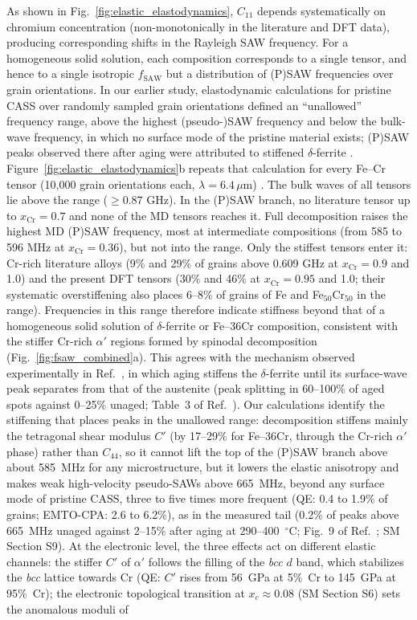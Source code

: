 \documentclass[final,3p,times]{elsarticle}
\begin{document}
As shown in Fig.~\ref{fig:elastic_elastodynamics}, $C_{11}$ depends systematically on chromium concentration (non-monotonically in the literature and DFT data), producing corresponding shifts in the Rayleigh SAW frequency. For a homogeneous solid solution, each composition corresponds to a single tensor, and hence to a single isotropic $f_{\mathrm{SAW}}$ but a distribution of (P)SAW frequencies over grain orientations. In our earlier study, elastodynamic calculations for pristine CASS over randomly sampled grain orientations defined an ``unallowed'' frequency range, above the highest (pseudo-)SAW frequency and below the bulk-wave frequency, in which no surface mode of the pristine material exists; (P)SAW peaks observed there after aging were attributed to stiffened $\delta$-ferrite \cite{al2023detecting}. Figure~\ref{fig:elastic_elastodynamics}b repeats that calculation for every Fe--Cr tensor (10{,}000 grain orientations each, $\lambda=6.4\,\mu$m) \cite{du2017facile}. The bulk waves of all tensors lie above the range ($\geq0.87$ GHz). In the (P)SAW branch, no literature tensor up to $x_{\mathrm{Cr}}=0.7$ and none of the MD tensors reaches it. Full decomposition raises the highest MD (P)SAW frequency, most at intermediate compositions (from 585 to 596 MHz at $x_{\mathrm{Cr}}=0.36$), but not into the range. Only the stiffest tensors enter it: Cr-rich literature alloys (9\% and 29\% of grains above 0.609 GHz at $x_{\mathrm{Cr}}=0.9$ and 1.0) and the present DFT tensors (30\% and 46\% at $x_{\mathrm{Cr}}=0.95$ and 1.0; their systematic overstiffening also places 6--8\% of grains of Fe and Fe$_{50}$Cr$_{50}$ in the range). Frequencies in this range therefore indicate stiffness beyond that of a homogeneous solid solution of $\delta$-ferrite or Fe--36Cr composition, consistent with the stiffer Cr-rich $\alpha'$ regions formed by spinodal decomposition (Fig.~\ref{fig:fsaw_combined}a). This agrees with the mechanism observed experimentally in Ref.~\cite{al2023detecting}, in which aging stiffens the $\delta$-ferrite until its surface-wave peak separates from that of the austenite (peak splitting in 60--100\% of aged spots against 0--25\% unaged; Table~3 of Ref.~\cite{al2023detecting}). Our calculations identify the stiffening that places peaks in the unallowed range: decomposition stiffens mainly the tetragonal shear modulus $C'$ (by 17--29\% for Fe--36Cr, through the Cr-rich $\alpha'$ phase) rather than $C_{44}$, so it cannot lift the top of the (P)SAW branch above about 585~MHz for any microstructure, but it lowers the elastic anisotropy and makes weak high-velocity pseudo-SAWs above 665~MHz, beyond any surface mode of pristine CASS, three to five times more frequent (QE: 0.4 to 1.9\% of grains; EMTO-CPA: 2.6 to 6.2\%), as in the measured tail (0.2\% of peaks above 665~MHz unaged against 2--15\% after aging at 290--400~$^\circ$C; Fig.~9 of Ref.~\cite{al2023detecting}; SM Section S9). At the electronic level, the three effects act on different elastic channels: the stiffer $C'$ of $\alpha'$ follows the filling of the \textit{bcc} $d$ band, which stabilizes the \textit{bcc} lattice towards Cr \cite{soderlind1993theory} (QE: $C'$ rises from 56~GPa at 5\%~Cr to 145~GPa at 95\%~Cr); the electronic topological transition at $x_c\approx0.08$ (SM Section S6) sets the anomalous moduli of 
\end{document}
